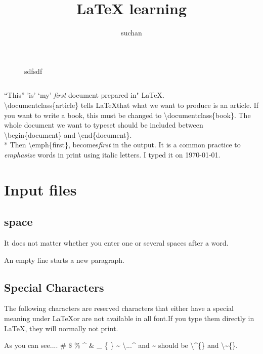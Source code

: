 \documentclass[11pt]{article}
\title{\LaTeX{}  learning}
\author{suchan}
\begin{document}
\maketitle

\begin{figure}
	\centering
\caption{sdfsdf}

\end{figure}
\inputminted[linenos]{c}{avg_realloc.c}
``This'' 'is' `my' \emph{first} document prepared in" \LaTeX.\\
\textbackslash documentclass\{article\} tells \LaTeX that what we want to produce is an article. If you want to write a book, this must be changed to \textbackslash documentclass\{book\}. The whole document we want to typeset should be included between \textbackslash begin\{document\} and \textbackslash end\{document\}.
\\* Then \textbackslash emph\{first\}, becomes\emph{first} in the output. It is a common practice to \emph{emphasize} words in print using italic letters. I typed it on \today.

\section{Input files}
\subsection{space}
It does not matter whether you enter one or several     spaces after a word.

An empty line starts a new paragraph.
\subsection{Special Characters}
The following characters are reserved characters that either have a special meaning under \LaTeX or are not available in all font.If you type them directly in \LaTeX, they will normally not print.

As you can see.... \# \$ \% \^{} \& \_ \{ \} \~{} \textbackslash...\^{} and \~{} should be \textbackslash \^{}\{\} and \textbackslash \~{}\{\}.
\end{document}
